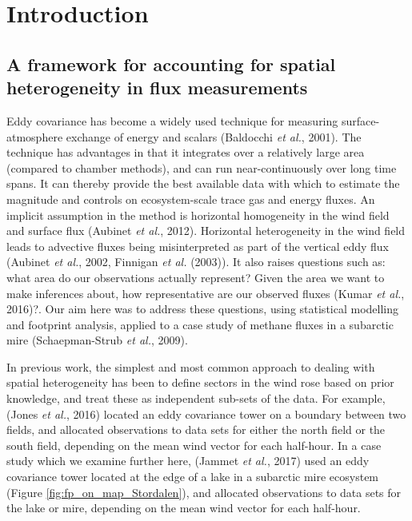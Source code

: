 \section{Introduction}\label{introduction}

\subsection{A framework for accounting for spatial heterogeneity in flux
measurements}\label{a-framework-for-accounting-for-spatial-heterogeneity-in-flux-measurements}

Eddy covariance has become a widely used technique for measuring
surface-atmosphere exchange of energy and scalars (Baldocchi \emph{et
al.}, 2001). The technique has advantages in that it integrates over a
relatively large area (compared to chamber methods), and can run
near-continuously over long time spans. It can thereby provide the best
available data with which to estimate the magnitude and controls on
ecosystem-scale trace gas and energy fluxes. An implicit assumption in
the method is horizontal homogeneity in the wind field and surface flux
(Aubinet \emph{et al.}, 2012). Horizontal heterogeneity in the wind
field leads to advective fluxes being misinterpreted as part of the vertical eddy flux
(Aubinet \emph{et al.}, 2002, Finnigan \emph{et al.} (2003)). It also raises questions such as: what area do our observations actually
represent? Given the area we want to make inferences about, how
representative are our observed fluxes (Kumar \emph{et al.}, 2016)?. Our
aim here was to address these questions, using statistical modelling and
footprint analysis, applied to a case study of methane fluxes in a
subarctic mire (Schaepman-Strub \emph{et al.}, 2009).

In previous work, the simplest and most common approach to dealing with
spatial heterogeneity has been to define sectors in the wind rose based
on prior knowledge, and treat these as independent sub-sets of the data.
For example, (Jones \emph{et al.}, 2016) located an eddy covariance
tower on a boundary between two fields, and allocated observations to
data sets for either the north field or the south field, depending on
the mean wind vector for each half-hour. In a case study which we
examine further here, (Jammet \emph{et al.}, 2017) used an eddy
covariance tower located at the edge of a lake in a subarctic mire
ecosystem (Figure \ref{fig:fp_on_map_Stordalen}), and allocated
observations to data sets for the lake or mire, depending on the mean
wind vector for each half-hour.


